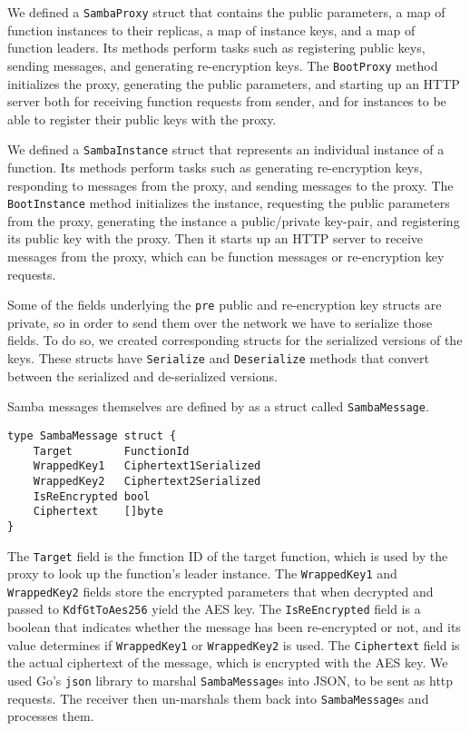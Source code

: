 We defined a \texttt{Samba\-Proxy} struct that contains the public parameters, a map of function instances to their replicas, a map of instance keys, and a map of function leaders.
Its methods perform tasks such as registering public keys, sending messages, and generating re-encryption keys.
The \texttt{BootProxy} method initializes the proxy, generating the public parameters, and starting up an HTTP server both for receiving function requests from sender, and for instances to be able to register their public keys with the proxy.

We defined a \texttt{Samba\-Instance} struct that represents an individual instance of a function.
Its methods perform tasks such as generating re-encryption keys, responding to messages from the proxy, and sending messages to the proxy.
The \texttt{BootInstance} method initializes the instance, requesting the public parameters from the proxy, generating the instance a public/private key-pair, and registering its public key with the proxy.
Then it starts up an HTTP server to receive messages from the proxy, which can be function messages or re-encryption key requests.

Some of the fields underlying the \texttt{pre} public and re-encryption key structs are private, so in order to send them over the network we have to serialize those fields.
To do so, we created corresponding structs for the serialized versions of the keys.
These structs have \texttt{Serialize} and \texttt{Deserialize} methods that convert between the serialized and de-serialized versions.

Samba messages themselves are defined by as a struct called \texttt{Samba\-Message}.
\begin{lstlisting}
type SambaMessage struct {
	Target        FunctionId
	WrappedKey1   Ciphertext1Serialized
	WrappedKey2   Ciphertext2Serialized
	IsReEncrypted bool
	Ciphertext    []byte
}
\end{lstlisting}

The \texttt{Target} field is the function ID of the target function, which is used by the proxy to look up the function's leader instance.
The \texttt{WrappedKey1} and \texttt{WrappedKey2} fields store the encrypted parameters that when decrypted and passed to \texttt{KdfGtToAes256} yield the AES key.
The \texttt{IsReEncrypted} field is a boolean that indicates whether the message has been re-encrypted or not, and its value determines if \texttt{WrappedKey1} or \texttt{WrappedKey2} is used.
The \texttt{Ciphertext} field is the actual ciphertext of the message, which is encrypted with the AES key.
We used Go's \texttt{json} library to marshal \texttt{Samba\-Message}s into JSON, to be sent as http requests.
The receiver then un-marshals them back into \texttt{Samba\-Message}s and processes them.

